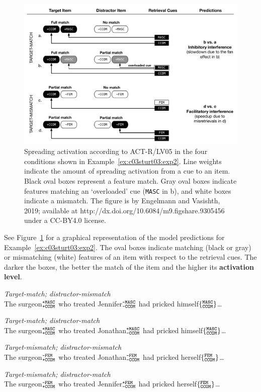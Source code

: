 \documentclass{cambridge7A}\usepackage[]{graphicx}\usepackage[]{color}
\newcommand{\actrcue}[1]{\texttt{\uppercase{#1}}}
\newcommand{\featureset}[2]{$\{^{\texttt{\uppercase{#1}}}_{\texttt{\uppercase{#2}}}\}$}
\newcommand{\featuresetNP}[2]{$^{\texttt{\uppercase{#1}}}_{\texttt{\uppercase{#2}}}$}
\begin{document}
\begin{figure}[!htbp]
\includegraphics[width=\textwidth]{figures/tableLV05pred}
    \caption{Spreading activation according to ACT-R/LV05 in the four conditions shown in Example~\ref{ex:c03sturt03:exp2}. Line weights indicate the amount of spreading activation from a cue to an item. Black oval boxes represent a feature match. Gray oval boxes indicate features matching an `overloaded' cue (\actrcue{MASC} in b), and white boxes indicate a mismatch. The figure is by Engelmann and Vasishth, 2019; available at http://dx.doi.org/10.6084/m9.figshare.9305456 under a CC-BY4.0 license.}\label{fig:c03ACTRpred}
\end{figure}


See Figure~\ref{fig:c03ACTRpred} for a graphical representation of the model predictions for Example~\ref{ex:c03sturt03:exp2}. The oval boxes indicate matching (black or gray) or mismatching (white) features of an item with respect to the retrieval cues. The darker the boxes, the better the match of the item and the higher its  \textbf{activation level}.

\begin{exe}
\ex\label{ex:c03sturt03:exp2}
\begin{xlist}
\item \textit{Target-match; distractor-mismatch}\\
The surgeon\featuresetNP{+MASC}{+CCOM} who treated Jennifer\featuresetNP{-MASC}{-CCOM} had pricked himself\featureset{MASC}{CCOM}\dots
\item \textit{Target-match; distractor-match}\\
The surgeon\featuresetNP{+MASC}{+CCOM} who treated Jonathan\featuresetNP{+MASC}{-CCOM} had pricked himself\featureset{MASC}{CCOM}\dots
\item \textit{Target-mismatch; distractor-mismatch}\\
The surgeon\featuresetNP{-FEM}{+CCOM} who treated Jonathan\featuresetNP{-FEM}{-CCOM} had pricked herself\featureset{FEM}{CCOM}\dots
\item \textit{Target-mismatch; distractor-match}\\
The surgeon\featuresetNP{-FEM}{+CCOM} who treated Jennifer\featuresetNP{+FEM}{-CCOM} had pricked herself\featureset{FEM}{CCOM}\dots
\end{xlist}
\end{exe}
\end{document}
